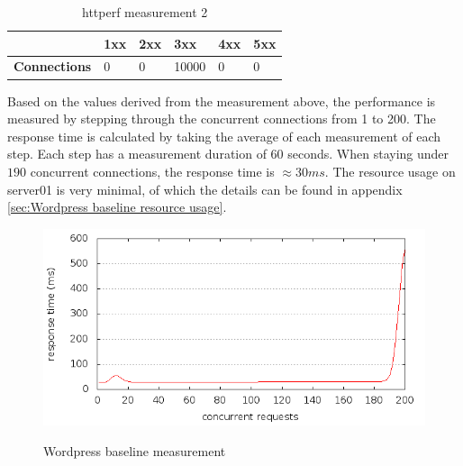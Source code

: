 \documentclass[Experiments]{subfiles}
\begin{document}
\begin{table}[H]
\caption{httperf measurement 2}
\begin{tabular}{|p{2cm}|p{}|p{}|p{}|p{}|p{}|}
\hline
 & \textbf{1xx} & \textbf{2xx} & \textbf{3xx} & \textbf{4xx} & \textbf{5xx} \\ \hline
\textbf{Connections} & 0 & 0 & 10000 & 0 & 0 \\ \hline
\end{tabular}
\label{fig:Baseline measurement 2}
\end{table}

Based on the values derived from the measurement above, the performance is measured by stepping through the concurrent connections from 1 to 200. The response time is calculated by taking the average of each measurement of  each step. Each step has a measurement duration of 60 seconds. When staying under $190$ concurrent connections, the response time is \mbox{$\approx 30 ms$}. The resource usage on server01 is very minimal, of which the details can be found in appendix \ref{sec:Wordpress baseline resource usage}.

\begin{figure}[H]
\caption{Wordpress baseline measurement}
\centering
\includegraphics[scale=0.55] {images/results/baseline_wp/output.png}
\label{fig:Baseline performance measurement}
\end{figure}
\end{document}

